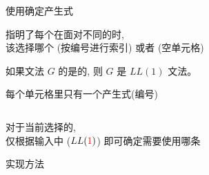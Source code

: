 \begin{frame}{}
  \begin{center}
    {\large 使用确定产生式}
    

    
    指明了每个在面对不同的时, \\[4pt]
    该选择哪个 (按编号进行索引) 或者 (空单元格)
  \end{center}
\end{frame}

\begin{frame}{}
  \begin{center}
    \begin{definition}[$LL(1)$文法]
      如果文法 $G$ 的是的,
      则 $G$ 是 $LL(1)$ 文法。
    \end{definition}

     每个单元格里只有一个产生式(编号) \\[8pt]

    \begin{columns}
        
        
    \end{columns}

    \vspace{0.60cm}
    对于当前选择的, \\[4pt]
    仅根据输入中 ($LL(\textcolor{red}{1})$) 即可确定需要使用哪条
  \end{center}
\end{frame}

\begin{frame}{}
  \begin{center}

    \pause
    

    \pause
    \vspace{0.30cm}
  \end{center}
\end{frame}

\begin{frame}{}
  \begin{center}
    {\large {}实现方法}

    \begin{columns}
        
        
        
    \end{columns}
  \end{center}
\end{frame}

